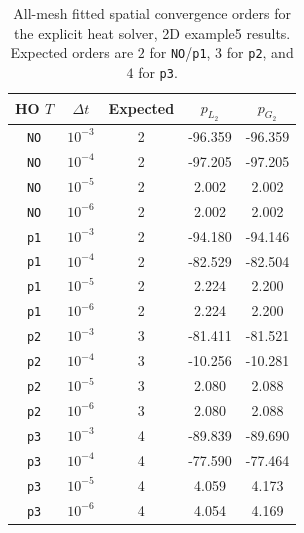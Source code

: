 \begin{table}[htbp]
\centering
\small
\caption{All-mesh fitted spatial convergence orders for the explicit heat solver, 2D example5 results. Expected orders are $2$ for \texttt{NO}/\texttt{p1}, $3$ for \texttt{p2}, and $4$ for \texttt{p3}.}
\label{tab:heat-explicit-orders-2D}
\begin{tabular}{ccccc}
\toprule
HO $T$ & $\Delta t$ & Expected & $p_{L_2}$ & $p_{G_2}$ \\
\midrule
\texttt{NO} & $10^{-3}$ & 2 & -96.359 & -96.359 \\
\texttt{NO} & $10^{-4}$ & 2 & -97.205 & -97.205 \\
\texttt{NO} & $10^{-5}$ & 2 & 2.002 & 2.002 \\
\texttt{NO} & $10^{-6}$ & 2 & 2.002 & 2.002 \\
\texttt{p1} & $10^{-3}$ & 2 & -94.180 & -94.146 \\
\texttt{p1} & $10^{-4}$ & 2 & -82.529 & -82.504 \\
\texttt{p1} & $10^{-5}$ & 2 & 2.224 & 2.200 \\
\texttt{p1} & $10^{-6}$ & 2 & 2.224 & 2.200 \\
\texttt{p2} & $10^{-3}$ & 3 & -81.411 & -81.521 \\
\texttt{p2} & $10^{-4}$ & 3 & -10.256 & -10.281 \\
\texttt{p2} & $10^{-5}$ & 3 & 2.080 & 2.088 \\
\texttt{p2} & $10^{-6}$ & 3 & 2.080 & 2.088 \\
\texttt{p3} & $10^{-3}$ & 4 & -89.839 & -89.690 \\
\texttt{p3} & $10^{-4}$ & 4 & -77.590 & -77.464 \\
\texttt{p3} & $10^{-5}$ & 4 & 4.059 & 4.173 \\
\texttt{p3} & $10^{-6}$ & 4 & 4.054 & 4.169 \\
\bottomrule
\end{tabular}
\end{table}

